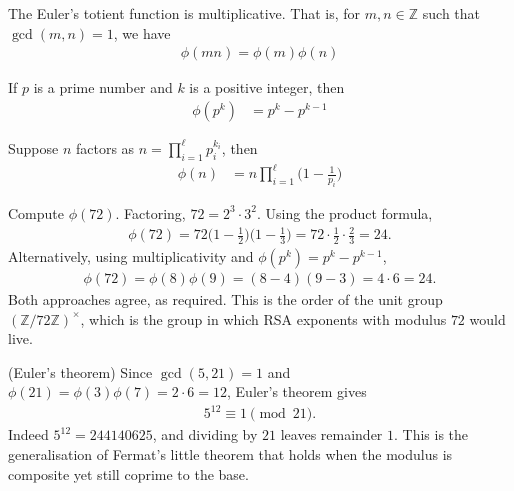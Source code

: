 \documentclass[a4paper, 12pt]{book} %
\begin{document}
\begin{proposition}
    The Euler's totient function is multiplicative. That is, for $m, n \in \mathbb{Z}$ such that $\gcd(m, n) = 1$, we have 
    \begin{align}
        \phi(mn) = \phi(m) \phi(n)
    \end{align}
\end{proposition}

\begin{proposition}
    If $p$ is a prime number and $k$ is a positive integer, then 
    \begin{align}
        \phi(p^k) &= p^k - p^{k-1}
    \end{align}
\end{proposition}


\begin{proposition}
    Suppose $n$ factors as $n = \prod_{i=1}^\ell p_i^{k_i}$, then 
    \begin{align}
        \phi(n) &= n \prod_{i=1}^\ell \bigg( 1 - \frac{1}{p_i}\bigg)
    \end{align}
\end{proposition}

\begin{example}
    Compute $\phi(72)$. Factoring, $72 = 2^3 \cdot 3^2$. Using the product formula,
    \begin{align}
        \phi(72) = 72\bigg(1 - \frac12\bigg)\bigg(1 - \frac13\bigg)
                  = 72 \cdot \frac12 \cdot \frac23 = 24.
    \end{align}
    Alternatively, using multiplicativity and $\phi(p^k) = p^k - p^{k-1}$, 
    \begin{align}
        \phi(72) = \phi(8)\phi(9) = (8 - 4)(9 - 3) = 4 \cdot 6 = 24.
    \end{align}
    Both approaches agree, as required. This is the order of the unit group $(\mathbb{Z}/72\mathbb{Z})^\times$, which is the group in which RSA exponents with modulus $72$ would live.
\end{example}

\begin{example}
    (Euler's theorem) Since $\gcd(5, 21) = 1$ and $\phi(21) = \phi(3)\phi(7) = 2 \cdot 6 = 12$, Euler's theorem gives
    \begin{align}
        5^{12} \equiv 1 \pmod{21}.
    \end{align}
    Indeed $5^{12} = 244140625$, and dividing by $21$ leaves remainder $1$. This is the generalisation of Fermat's little theorem that holds when the modulus is composite yet still coprime to the base.
\end{example}
\end{document}
